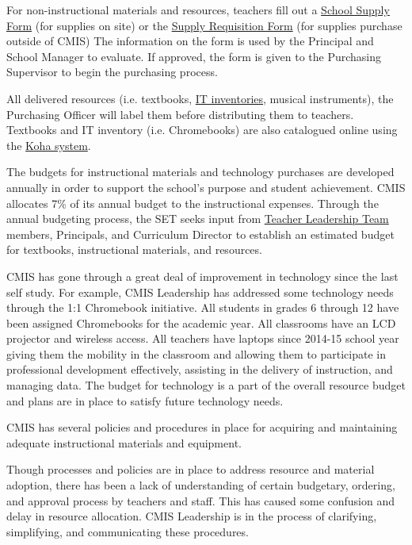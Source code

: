 \begin{findings}
For non-instructional materials and resources, teachers fill out a \href{https://docs.google.com/document/d/1X2HU8VcgV48m1ZY_-3AztVdD8j5VwBu6O319_9W825M/edit}{School Supply Form}  (for supplies on site) or the  \href{https://docs.google.com/document/d/125eFGQt3dRQkHOhyhMHIx6Eup4jG9Zc4B2mYjvgxpqg/edit}{Supply Requisition Form} (for supplies purchase outside of CMIS) The information on the form is used by the Principal and School Manager to evaluate. If approved, the form is given to the Purchasing Supervisor to begin the purchasing process.

All delivered resources (i.e. textbooks, \href{https://docs.google.com/spreadsheets/d/1T_vMmATtxHEartDVy76fRwgws8cWChwxHOLEDzgGyEc/edit?ts=589d58a6#gid=0}{IT inventories}, musical instruments), the Purchasing Officer will label them before distributing them to teachers. Textbooks and IT inventory (i.e. Chromebooks) are also catalogued online using the \href{http://library.cmis.ac.th/}{Koha system}. 

 
The budgets for instructional materials and technology purchases are developed annually in order to support the school’s purpose and student achievement. CMIS allocates 7\% of its annual budget to the instructional expenses. Through the annual budgeting process, the SET seeks input from \href{https://docs.google.com/document/d/1iW_tWIwRlWU2p0oIOvd3usDsxj9qYDt_2ROwNPBTHSc/edit}{Teacher Leadership Team} members, Principals, and Curriculum Director to establish an estimated budget for textbooks, instructional materials, and resources.

CMIS has gone through a great deal of improvement in technology since the last self study. For example, CMIS Leadership has addressed some technology needs through the 1:1 Chromebook initiative. All students in grades 6 through 12 have been assigned Chromebooks for the academic year. All classrooms have an LCD projector and wireless access. All teachers have laptops since 2014-15 school year giving them the mobility in the classroom and allowing them to participate in professional development effectively,  assisting in the delivery of instruction, and managing data. The budget for technology is a part of the overall resource budget and plans are in place to satisfy future technology needs.


CMIS has several policies and procedures in place for acquiring and maintaining adequate instructional materials and equipment.

Though processes and policies are in place to address resource and material adoption, there has been a lack of understanding of certain budgetary, ordering, and approval process by teachers and staff. This has caused some confusion and delay in resource allocation. CMIS Leadership is in the process of clarifying, simplifying, and communicating these procedures.
\end{findings}

